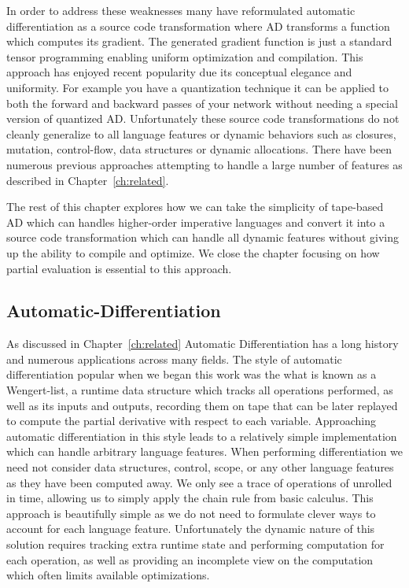 In order to address these weaknesses many have reformulated
  automatic differentiation as a source code transformation
  where AD transforms a function which computes its gradient.
The generated gradient function is just a standard tensor programming
  enabling uniform optimization and compilation.
This approach has enjoyed recent popularity due its conceptual
  elegance and uniformity.
For example you have a quantization technique it can be applied
  to both the forward and backward passes of your
  network without needing a special version of quantized AD.
Unfortunately these source code transformations do not cleanly
  generalize to all language features or dynamic behaviors such
  as closures, mutation, control-flow, data structures or dynamic allocations.
There have been numerous previous approaches attempting to handle a large number
  of features as described in Chapter~\ref{ch:related}.

The rest of this chapter explores how we can take the simplicity of
  tape-based AD which can handles higher-order imperative languages
  and convert it into a source code transformation which can handle all
  dynamic features without giving up the ability to compile and optimize.
We close the chapter focusing on how partial evaluation is essential to this
  approach.

\subsection{Automatic-Differentiation}

As discussed in Chapter~\ref{ch:related} Automatic Differentiation has a long history
  and numerous applications across many fields.
The style of automatic differentiation popular when we began this work was the
  what is known as a Wengert-list, a runtime data structure which tracks
  all operations performed, as well as its inputs and outputs, recording them on tape
  that can be later replayed to compute the partial derivative with respect to each variable.
Approaching automatic differentiation in this style leads to a relatively simple
  implementation which can handle arbitrary language features.
When performing differentiation we need not consider data
  structures, control, scope, or any other language features as they
  have been computed away.
We only see a trace of operations of unrolled in time, allowing us
  to simply apply the chain rule from basic calculus.
This approach is beautifully simple as we do not need to formulate
  clever ways to account for each language feature.
Unfortunately the dynamic nature of this solution requires tracking extra runtime state
  and performing computation for each operation, as well as providing an incomplete
  view on the computation which often limits available optimizations.

